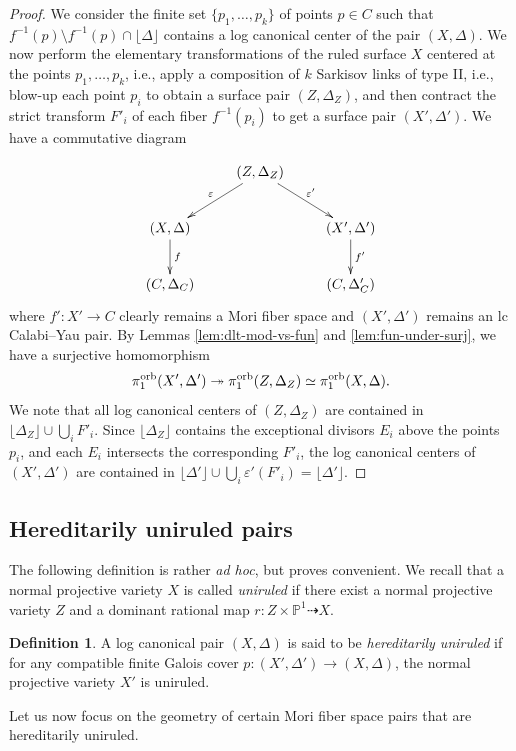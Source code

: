 \documentclass{amsart}
\newcommand{\pp}{\mathbb{P}}
\theoremstyle{definition}
\newtheorem{definition}[theorem]{Definition}
\theoremstyle{remark}
\numberwithin{equation}{section}
\begin{document}
\begin{proof}
We consider the finite set $\{p_1,\ldots,p_k\}$ of points $p\in C$ such that $f^{-1}(p)\setminus f^{-1}(p)\cap \lfloor\Delta\rfloor$ contains a log canonical center of the pair $(X,\Delta)$.
We now perform the elementary transformations of the ruled surface $X$ centered at the points $p_1,\ldots,p_k$, i.e., apply a composition of $k$ Sarkisov links of type II, i.e., blow-up each point $p_i$ to obtain a surface pair $(Z,\Delta_Z)$, and then contract the strict transform $F'_i$ of each fiber $f^{-1}(p_i)$ to get a surface pair $(X',\Delta')$. We have a commutative diagram

$$\xymatrix{
& (Z,\Delta_Z)\ar[dl]_{\varepsilon} \ar[dr]^{\varepsilon'} &\\
(X,\Delta) \ar[d]^{f} & &(X',\Delta')\ar[d]^{f'} \\
(C,\Delta_{C}) & & (C,\Delta'_C)
}$$
where $f':X'\to C$ clearly remains a Mori fiber space and $(X',\Delta')$ remains an lc Calabi--Yau pair. By Lemmas \ref{lem:dlt-mod-vs-fun} and \ref{lem:fun-under-surj}, we have a surjective homomorphism
$$\pi_1^{\rm orb}(X',\Delta')\twoheadrightarrow \pi_1^{\rm orb}(Z,\Delta_Z)\simeq\pi_1^{\rm orb}(X,\Delta).$$
We note that all log canonical centers of $(Z,\Delta_Z)$ are contained in $\lfloor\Delta_Z\rfloor\cup \bigcup_{i} F'_i.$
Since $\lfloor\Delta_Z\rfloor$ contains the exceptional divisors $E_i$ above the points $p_i$, and each $E_i$ intersects the corresponding $F'_i$, the log canonical centers of $(X',\Delta')$ are contained in $\lfloor \Delta'\rfloor\cup \bigcup_{i} \varepsilon'(F'_i)=\lfloor\Delta'\rfloor$.
\end{proof}

\subsection{Hereditarily uniruled pairs}
The following definition is rather {\it ad hoc}, but proves convenient. We recall that a normal projective variety $X$ is called {\it uniruled} if there exist a normal projective variety $Z$ and a dominant rational map $r:Z\times\pp^1\dashrightarrow X$.

\begin{definition}
    A log canonical pair $(X,\Delta)$ is said to be {\it hereditarily uniruled} if for any compatible finite Galois cover $p:(X',\Delta')\to (X,\Delta)$, the normal projective variety $X'$ is uniruled.
\end{definition}

Let us now focus on the geometry of certain Mori fiber space pairs that are hereditarily uniruled.
\end{document}
